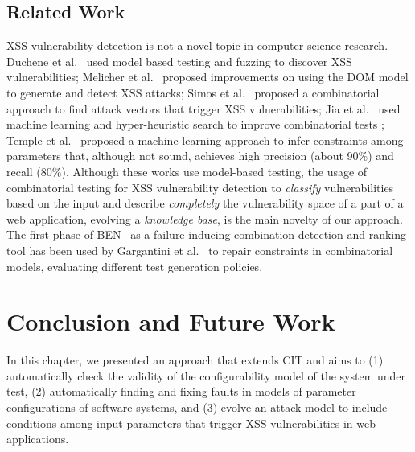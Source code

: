 \begin{tikzborder}{\cite{Gargantini16:validation}}
\begin{tikzborder}{\cite{gargantini_combinatorial_2017}}
\begin{tikzborder}{\cite{garn2019}}
\subsection{Related Work}\label{sec:xssrelatedwork}
\bb XSS vulnerability detection is not a novel topic in computer science research. %
Duchene et al.~\cite{Duchene:2012} used model based testing and fuzzing to discover XSS vulnerabilities; Melicher et al.~\cite{melicher_riding_2018} proposed improvements on using the DOM model to generate
and detect
XSS attacks; %
Simos et al.~\cite{wotawa_combinatorial_2016} proposed a combinatorial approach to find attack vectors that trigger XSS vulnerabilities; Jia et al.~\cite{Jia:2015} %
used machine learning and hyper-heuristic search to improve combinatorial tests%
; Temple et al.~\cite{Temple16:using} proposed a machine-learning approach to infer constraints among parameters that, although not sound, achieves high precision (about 90\%) and recall (80\%).
Although these works use model-based testing,%
the usage of combinatorial testing for XSS vulnerability detection to \textit{classify} vulnerabilities based on the input and describe \textit{completely} the vulnerability space of a part of a web application, evolving a \textit{knowledge base}, is the main novelty of our approach.
The first phase of BEN~\cite{ghandehari2018combinatorial} as a failure-inducing combination detection and ranking tool 
has been used by Gargantini et al.~\cite{gargantini_combinatorial_2017} to repair constraints in combinatorial models, evaluating different test generation policies.
\be

\section{Conclusion and Future Work}\label{sec:conclusion-future-work}

In this chapter, we presented an approach that extends CIT and aims to (1) automatically check the validity of the configurability model of the system under test, (2) automatically finding and fixing faults in models of parameter configurations of software systems, and (3) evolve an attack model to include conditions among input parameters that trigger XSS vulnerabilities in web applications. 


\end{tikzborder}
\end{tikzborder}
\end{tikzborder}
